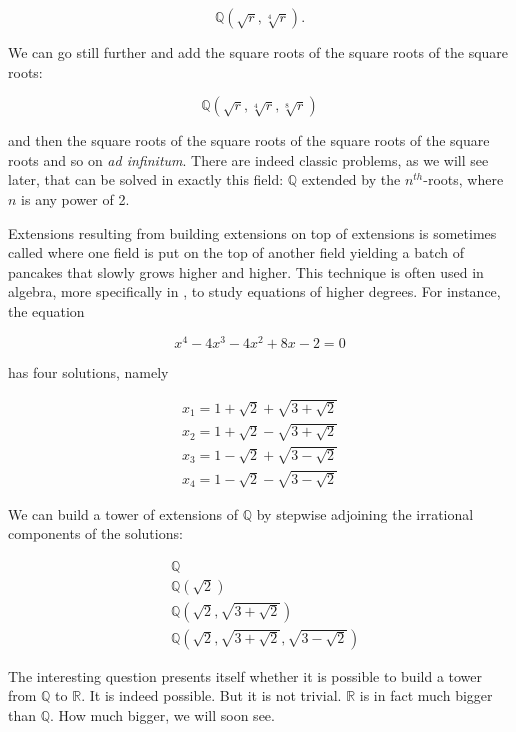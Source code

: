 \documentclass[tikz]{scrreprt}
\begin{document}
\[
\mathbb{Q}(\sqrt{r},\sqrt[4]{r}).
\]

We can go still further and add the square roots 
of the square roots of the square roots:

\[
\mathbb{Q}(\sqrt{r},\sqrt[4]{r},\sqrt[8]{r})
\]

and then the square roots of the square roots of the square roots
of the square roots and so on \emph{ad infinitum}.
There are indeed classic problems, as we will see later, that can be solved
in exactly this field: $\mathbb{Q}$ extended by the $n^{th}$-roots,
where $n$ is any power of 2.

Extensions resulting from building extensions on top of extensions 
is sometimes called  where one field is
put on the top of another field yielding a batch of pancakes 
that slowly grows higher and higher.
This technique is often used in algebra, more specifically in 
, to study equations of higher degrees.
For instance, the equation

\begin{equation}
x^4 - 4x^3 - 4x^2 + 8x - 2 = 0
\end{equation}

has four solutions, namely

\begin{align*}
x_1 = 1 + \sqrt{2} + \sqrt{3 + \sqrt{2}}\\
x_2 = 1 + \sqrt{2} - \sqrt{3 + \sqrt{2}}\\
x_3 = 1 - \sqrt{2} + \sqrt{3 - \sqrt{2}}\\
x_4 = 1 - \sqrt{2} - \sqrt{3 - \sqrt{2}}
\end{align*}

We can build a tower of extensions of $\mathbb{Q}$ by
stepwise adjoining the irrational components of the solutions:

\begin{align*}
&\mathbb{Q}\\
&\mathbb{Q}\left(\sqrt{2}\right)\\
&\mathbb{Q}\left(\sqrt{2},\sqrt{3+\sqrt{2}}\right)\\
&\mathbb{Q}\left(\sqrt{2},\sqrt{3+\sqrt{2}},\sqrt{3-\sqrt{2}}\right)
\end{align*}

The interesting question presents itself whether it is possible
to build a tower from $\mathbb{Q}$ to $\mathbb{R}$.
It is indeed possible. But it is not trivial.
$\mathbb{R}$ is in fact much bigger than $\mathbb{Q}$.
How much bigger, we will soon see.
\end{document}
